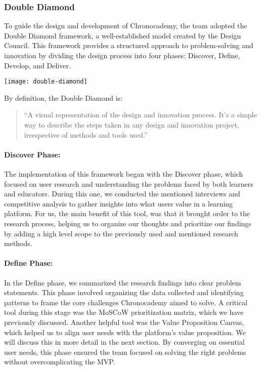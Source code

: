 \subsubsection{Double Diamond}\label{subsubsec:double-diamond}
To guide the design and development of Chronocademy, the team adopted the Double Diamond framework, a well-established model created by the Design Council.
This framework provides a structured approach to problem-solving and innovation by dividing the design process into four phases: Discover, Define, Develop, and Deliver.

\begin{center}
    \texttt{[image: double-diamond]}
\end{center}
By definition, the Double Diamond is:
\begin{quote}
    ``A visual representation of the design and innovation process.
    It’s a simple way to describe the steps taken in any design and innovation project, irrespective of methods and tools used.''~\cite[Double Diamond]{doubleDiamond}
\end{quote}

\paragraph{Discover Phase:}
The implementation of this framework began with the Discover phase, which focused on user research and understanding the problems faced by both learners and educators.
During this one, we conducted the mentioned interviews and competitive analysis to gather insights into what users value in a learning platform.
For us, the main benefit of this tool, was that it brought order to the research process, helping us to organize our thoughts and prioritize our findings by adding a high level scope to the previously used and mentioned research methods.\newline

\paragraph{Define Phase:}
In the Define phase, we summarized the research findings into clear problem statements.
This phase involved organizing the data collected and identifying patterns to frame the core challenges Chronocademy aimed to solve.
A critical tool during this stage was the MoSCoW prioritization matrix, which we have previously discussed.
Another helpful tool was the Value Proposition Canvas, which helped us to align user needs with the platform's value proposition.
We will discuss this in more detail in the next section.
By converging on essential user needs, this phase ensured the team focused on solving the right problems without overcomplicating the MVP\@.\newline

